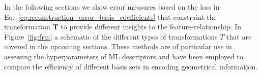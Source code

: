 %
%
%

In the following sections we show error measures based on the loss in Eq.~\ref{eq:reconstruction_error_basis_coefficients} that constraint the transformation $\mathbf{T}$ to provide different insights to the feature-relationship.
In Figure~\ref{fig:frm} a schematic of the different types of transformations $T$ that are covered in the upcoming sections.
These methods are of particular use in assessing the hyperparameters of ML descriptors\cite{goscinski2021role} and have been employed to compare the efficiency of different basis sets in encoding geometrical information\cite{musil2021physics, goscinski2021optimal}.


